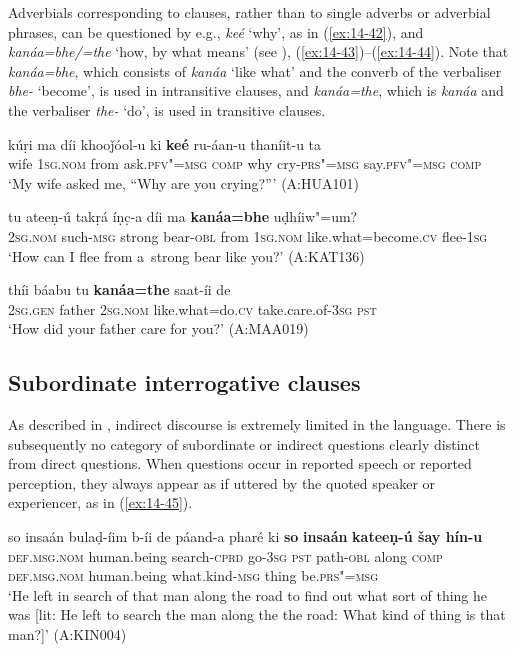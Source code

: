 Adverbials corresponding to clauses, rather than to single adverbs or adverbial phrases, can be questioned by e.g., \textit{keé} `why', as in (\ref{ex:14-42}), and \textit{kanáa=bhe/=the} `how, by what means' (see ), (\ref{ex:14-43})--(\ref{ex:14-44}). Note that \textit{kanáa=bhe}, which consists of \textit{kanáa} `like what' and the converb of the verbaliser \textit{bhe-} `become', is used in intransitive clauses, and \textit{kanáa=the}, which is \textit{kanáa} and the verbaliser \textit{the-} `do', is used in transitive clauses.

\begin{exe}
\ex
\label{ex:14-42}
\gll kúṛi ma díi khooǰóol-u ki \textbf{keé} ru-áan-u thaníit-u ta \\
wife \textsc{1sg.nom} from ask.\textsc{pfv"=msg} \textsc{comp} why  cry-\textsc{prs"=msg} say.\textsc{pfv"=msg} \textsc{comp}\\
\glt `My wife asked me, ``Why are you crying?''' (A:HUA101)

\ex
\label{ex:14-43}
\gll tu ateeṇ-ú takṛá íṇc̣-a díi ma \textbf{kanáa=bhe} uḍhíiw"=um? \\
\textsc{2sg.nom} such-\textsc{msg} strong bear-\textsc{obl} from \textsc{1sg.nom}  like.what=become.\textsc{cv} flee-\textsc{1sg} \\
\glt `How can I flee from a~strong bear like you?' (A:KAT136)

\ex
\label{ex:14-44}
\gll thíi báabu tu \textbf{kanáa=the} saat-íi de \\
\textsc{2sg.gen} father \textsc{2sg.nom} like.what=do.\textsc{cv} take.care.of-\textsc{3sg} \textsc{pst} \\
\glt `How did your father care for you?' (A:MAA019)
\end{exe}

\subsection{Subordinate interrogative clauses}
\label{subsec:14-2-3}


As described in , indirect discourse is extremely limited in the language. There is subsequently no category of subordinate or indirect questions clearly distinct from direct questions. When questions occur in reported speech or reported perception, they always appear as if uttered by the quoted speaker or experiencer, as in (\ref{ex:14-45}).

\begin{exe}
\ex
\label{ex:14-45}
\gll so insaán bulaḍ-íim b-íi de páand-a pharé ki \textbf{so} \textbf{insaán} \textbf{ kateeṇ-ú šay hín-u} \\
\textsc{def.msg.nom} human.being search-\textsc{cprd} go-\textsc{3sg} \textsc{pst} path-\textsc{obl} along \textsc{comp} \textsc{def.msg.nom} human.being what.kind-\textsc{msg} thing be.\textsc{prs"=msg } \\
\glt `He left in search of that man along the road to find out what sort of thing he was [lit: He left to search the man along the the road: What kind of thing is that man?]' (A:KIN004)
\end{exe}

